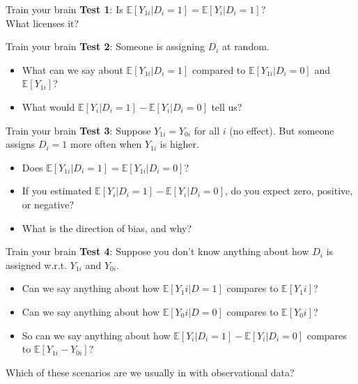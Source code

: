 \documentclass[xcolor=dvipsnames]{beamer}
\newcommand\E{\mathbb{E}}
\begin{document}
\begin{frame}{Train your brain}
 \textbf{Test 1}: Is $\E[Y_{1i}|D_i=1]=\E[Y_i|D_i=1]$?\\
\medskip
{} What licenses it?
\end{frame}

\begin{frame}{Train your brain}
 \textbf{Test 2}: Someone is assigning $D_i$ at random. 
\small
\begin{itemize}
\item<2-> What can we say about $\E[Y_{1i}|D_i=1]$ compared to $\E[Y_{1i}|D_i=0]$ and $\E[Y_{1i}]$?
\bigskip
\item<3-> What would $\E[Y_i|D_i=1]-\E[Y_i|D_i=0]$ tell us?
\end{itemize}
\end{frame}


\begin{frame}{Train your brain}
{} \textbf{Test 3}: Suppose $Y_{1i}=Y_{0i}$ for all $i$ (no effect). But someone assigns $D_i=1$ more often when $Y_{1i}$ is higher.
\small
\begin{itemize}
\item<2-> Does $\E[Y_{1i}|D_i=1]=\E[Y_{1i}|D_i=0]$?
\medskip
\item<3-> If you estimated $\E[Y_i|D_i=1]-\E[Y_i|D_i=0]$, do you expect zero, positive, or negative?
\medskip
\item<4-> What is the direction of bias, and why?
\end{itemize}
\end{frame}

\begin{frame}{Train your brain}
 \textbf{Test 4}: Suppose you don't know anything about how $D_i$ is assigned w.r.t. $Y_{1i}$ and $Y_{0i}$. 
\begin{itemize}
\item<2-> Can we say anything about how $\E[Y_1i|D=1]$ compares to $\E[Y_1i]$?
\bigskip
\item<3-> Can we say anything about how $\E[Y_0i|D=0]$ compares to $\E[Y_0i]$?
\bigskip
\item<4-> So can we say anything about how $\E[Y_i|D_i=1]-\E[Y_i|D_i=0]$ compares to $\E[Y_{1i}-Y_{0i}]$?
\end{itemize}
\bigskip
\normalsize
\begin{center}
\alert{ Which of these scenarios are we usually in with observational data?}
\end{center}
\end{frame}
\end{document}
